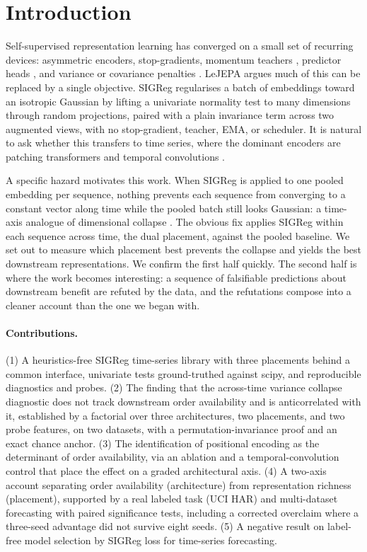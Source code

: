\documentclass[11pt]{article}
\begin{document}
\section{Introduction}

Self-supervised representation learning has converged on a small set of recurring devices:
asymmetric encoders, stop-gradients, momentum teachers \citep{byol2020}, predictor heads
\citep{simsiam2021}, and variance or covariance penalties \citep{vicreg2022,barlowtwins2021}.
LeJEPA \citep{lejepa2025} argues much of this can be replaced by a single objective. SIGReg
regularises a batch of embeddings toward an isotropic Gaussian by lifting a univariate normality
test to many dimensions through random projections, paired with a plain invariance term across two
augmented views, with no stop-gradient, teacher, EMA, or scheduler. It is natural to ask whether
this transfers to time series, where the dominant encoders are patching transformers
\citep{patchtst2023} and temporal convolutions \citep{tcn2018}.

A specific hazard motivates this work. When SIGReg is applied to one pooled embedding per sequence,
nothing prevents each sequence from converging to a constant vector along time while the pooled
batch still looks Gaussian: a time-axis analogue of dimensional collapse \citep{dimcollapse2022}.
The obvious fix applies SIGReg within each sequence across time, the dual placement, against the
pooled baseline. We set out to measure which placement best prevents the collapse and yields the
best downstream representations. We confirm the first half quickly. The second half is where the
work becomes interesting: a sequence of falsifiable predictions about downstream benefit are
refuted by the data, and the refutations compose into a cleaner account than the one we began with.

\paragraph{Contributions.}
(1) A heuristics-free SIGReg time-series library with three placements behind a common interface,
univariate tests ground-truthed against scipy, and reproducible diagnostics and probes.
(2) The finding that the across-time variance collapse diagnostic does not track downstream order
availability and is anticorrelated with it, established by a factorial over three architectures,
two placements, and two probe features, on two datasets, with a permutation-invariance proof and an
exact chance anchor.
(3) The identification of positional encoding as the determinant of order availability, via an
ablation and a temporal-convolution control that place the effect on a graded architectural axis.
(4) A two-axis account separating order availability (architecture) from representation richness
(placement), supported by a real labeled task (UCI HAR) and multi-dataset forecasting with paired
significance tests, including a corrected overclaim where a three-seed advantage did not survive
eight seeds.
(5) A negative result on label-free model selection by SIGReg loss for time-series forecasting.
\end{document}

